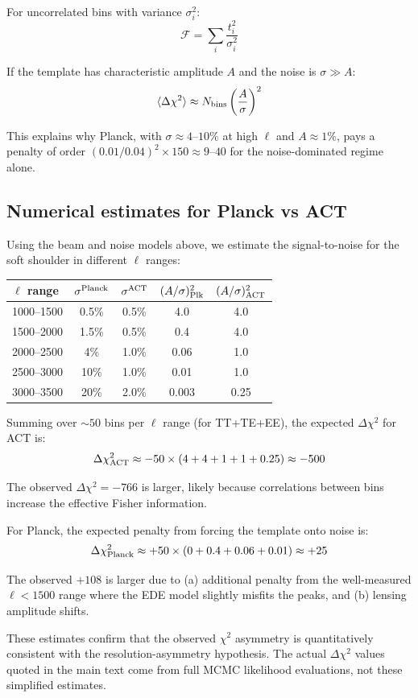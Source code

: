 \documentclass[onecolumn,showpacs,preprintnumbers,amsmath,amssymb,prd]{revtex4-2}
\begin{document}
For uncorrelated bins with variance $\sigma_i^2$:
\begin{equation}
\mathcal{F} = \sum_i \frac{t_i^2}{\sigma_i^2}
\end{equation}

If the template has characteristic amplitude $A$ and the noise is $\sigma \gg A$:
\begin{equation}
\langle \Delta\chi^2 \rangle \approx N_{\rm bins} \left(\frac{A}{\sigma}\right)^2
\end{equation}

This explains why Planck, with $\sigma \approx 4$--$10\%$ at high $\ell$ and 
$A \approx 1\%$, pays a penalty of order $(0.01/0.04)^2 \times 150 \approx 9$--$40$ 
for the noise-dominated regime alone.

\subsection{Numerical estimates for Planck vs ACT}

Using the beam and noise models above, we estimate the signal-to-noise for 
the soft shoulder in different $\ell$ ranges:

\begin{center}
\begin{tabular}{lcccc}
\toprule
$\ell$ range & $\sigma^{\rm Planck}$ & $\sigma^{\rm ACT}$ & $(A/\sigma)^2_{\rm Plk}$ & $(A/\sigma)^2_{\rm ACT}$ \\
\midrule
1000--1500 & 0.5\% & 0.5\% & 4.0 & 4.0 \\
1500--2000 & 1.5\% & 0.5\% & 0.4 & 4.0 \\
2000--2500 & 4\% & 1.0\% & 0.06 & 1.0 \\
2500--3000 & 10\% & 1.0\% & 0.01 & 1.0 \\
3000--3500 & 20\% & 2.0\% & 0.003 & 0.25 \\
\bottomrule
\end{tabular}
\end{center}

Summing over $\sim 50$ bins per $\ell$ range (for TT+TE+EE), the expected 
$\Delta\chi^2$ for ACT is:
\begin{equation}
\Delta\chi^2_{\rm ACT} \approx -50 \times (4 + 4 + 1 + 1 + 0.25) \approx -500
\end{equation}

The observed $\Delta\chi^2 = -766$ is larger, likely because correlations 
between bins increase the effective Fisher information.

For Planck, the expected penalty from forcing the template onto noise is:
\begin{equation}
\Delta\chi^2_{\rm Planck} \approx +50 \times (0 + 0.4 + 0.06 + 0.01) \approx +25
\end{equation}

The observed $+108$ is larger due to (a) additional penalty from the 
well-measured $\ell < 1500$ range where the EDE model slightly misfits 
the peaks, and (b) lensing amplitude shifts.

These estimates confirm that the observed $\chi^2$ asymmetry is quantitatively 
consistent with the resolution-asymmetry hypothesis. The actual $\Delta\chi^2$ 
values quoted in the main text come from full MCMC likelihood evaluations, 
not these simplified estimates.
\end{document}
